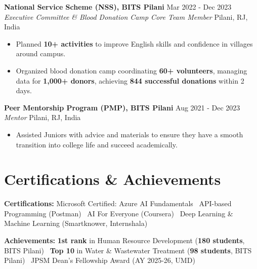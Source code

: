 \documentclass[11pt,letterpaper]{article}
\newcommand{\cvsection}[1]{\section*{#1}}
\begin{document}
\textbf{National Service Scheme (NSS), BITS Pilani} \hfill Mar 2022 - Dec 2023\\
\textit{Executive Committee \& Blood Donation Camp Core Team Member} \hfill Pilani, RJ, India
\begin{itemize}[leftmargin=16pt, noitemsep, topsep=2pt]
    \item Planned \textbf{10+ activities} to improve English skills and confidence in villages around campus.
    \item Organized blood donation camp coordinating \textbf{60+ volunteers}, managing data for \textbf{1,000+ donors}, achieving \textbf{844 successful donations} within 2 days.
\end{itemize}

\textbf{Peer Mentorship Program (PMP), BITS Pilani} \hfill Aug 2021 - Dec 2023\\
\textit{Mentor} \hfill Pilani, RJ, India
\begin{itemize}[leftmargin=16pt, noitemsep, topsep=2pt]
    \item Assisted Juniors with advice and materials to ensure they have a smooth transition into college life and succeed academically.
\end{itemize}

\cvsection{Certifications \& Achievements}

\textbf{Certifications:} Microsoft Certified: Azure AI Fundamentals \textbar\ API-based Programming (Postman) \textbar\ AI For Everyone (Coursera) \textbar\ Deep Learning \& Machine Learning (Smartknower, Internshala)

\textbf{Achievements:} \textbf{1st rank} in Human Resource Development (\textbf{180 students}, BITS Pilani) \textbar\ \textbf{Top 10} in Water \& Wastewater Treatment (\textbf{98 students}, BITS Pilani) \textbar\ JPSM Dean's Fellowship Award (AY 2025-26, UMD)
\end{document}
